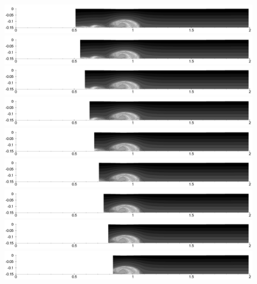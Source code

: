 \begin{figure}[htbp]
  \begin{center}    \includegraphics[scale=0.35]{../figures/Exp3-CASE1-dt0.005/rec_2_buf_24_sub_10/D1-101.pdf}
\includegraphics[scale=0.35]{../figures/Exp3-CASE1-dt0.005/rec_2_buf_24_sub_10/D1-102.pdf}
\includegraphics[scale=0.35]{../figures/Exp3-CASE1-dt0.005/rec_2_buf_24_sub_10/D1-103.pdf}
\includegraphics[scale=0.35]{../figures/Exp3-CASE1-dt0.005/rec_2_buf_24_sub_10/D1-104.pdf}
\includegraphics[scale=0.35]{../figures/Exp3-CASE1-dt0.005/rec_2_buf_24_sub_10/D1-105.pdf}
\includegraphics[scale=0.35]{../figures/Exp3-CASE1-dt0.005/rec_2_buf_24_sub_10/D1-106.pdf}
\includegraphics[scale=0.35]{../figures/Exp3-CASE1-dt0.005/rec_2_buf_24_sub_10/D1-107.pdf}
\includegraphics[scale=0.35]{../figures/Exp3-CASE1-dt0.005/rec_2_buf_24_sub_10/D1-108.pdf}
\includegraphics[scale=0.35]{../figures/Exp3-CASE1-dt0.005/rec_2_buf_24_sub_10/D1-109.pdf}

\end{center}
\end{figure}
